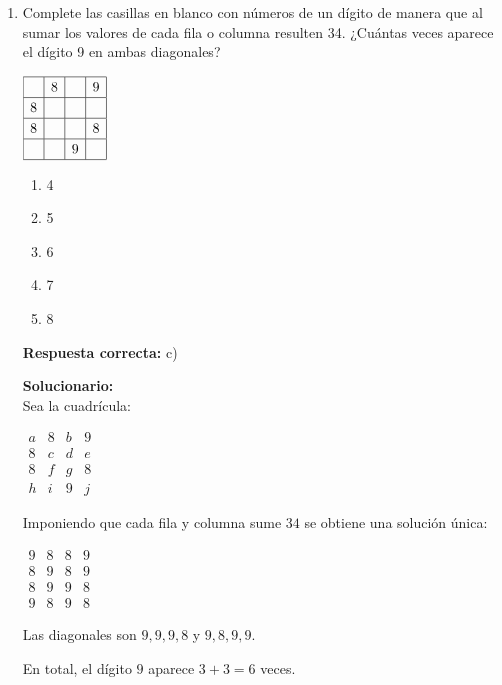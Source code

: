\begin{enumerate}

	
	\item Complete las casillas en blanco con números de un dígito de manera que al sumar los valores de cada fila o columna resulten 34. ¿Cuántas veces aparece el dígito 9 en ambas diagonales?
	
	\begin{center}
		$
		\renewcommand{\arraystretch}{1.2}
		\begin{array}{|c|c|c|c|}
			\hline
			& 8 &  & 9 \\
			\hline
			8 &  &  &  \\
			\hline
			8 &  &  & 8 \\
			\hline
			&  & 9 &  \\
			\hline
		\end{array}
		$
	\end{center}
	
	\begin{enumerate}[label=\alph*)]
		\item 4
		\item 5
		\item 6
		\item 7
		\item 8
	\end{enumerate}
	\textbf{Respuesta correcta:} c)
	
	\vspace{2mm}
	\textbf{Solucionario:}\\
	Sea la cuadrícula:
	
	$
	\begin{matrix}
		a&8&b&9\\
		8&c&d&e\\
		8&f&g&8\\
		h&i&9&j
	\end{matrix}
	$
	
	Imponiendo que cada fila y columna sume $34$ se obtiene una solución única:
	
	$
	\begin{matrix}
		9&8&8&9\\
		8&9&8&9\\
		8&9&9&8\\
		9&8&9&8
	\end{matrix}
	$
	
	Las diagonales son $9,9,9,8$ y $9,8,9,9$.
	
	En total, el dígito $9$ aparece $3+3=6$ veces.
	
	

\end{enumerate}
